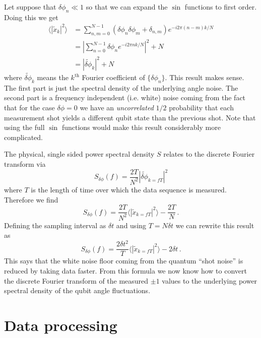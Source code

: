 \documentclass[twocolumn]{article}
\begin{document}
Let suppose that $\delta \phi_n \ll 1$ so that we can expand the $\sin$ functions to first order.
Doing this we get
\begin{align}
\langle |\tilde{x}_k|^2 \rangle
&= \sum_{n,m=0}^{N-1} \left( \delta \phi_n \delta \phi_m + \delta_{n,m} \right) e^{-i 2 \pi (n-m) k / N} \nonumber \\
&= \left| \sum_{n=0}^{N-1} \delta \phi_n e^{-i 2 \pi n k / N} \right|^2 + N \nonumber \\
&= \left| \tilde{\delta \phi}_k \right|^2 + N
\end{align}
where $\tilde{\delta \phi}_k$ means the $k^\text{th}$ Fourier coefficient of $\{ \delta \phi_n \}$.
This result makes sense.
The first part is just the spectral density of the underlying angle noise.
The second part is a frequency independent (i.e. white) noise coming from the fact that for the case $\delta \phi = 0$ we have an \emph{uncorrelated} $1/2$ probability that each measurement shot yields a different qubit state than the previous shot.
Note that using the full $\sin$ functions would make this result considerably more complicated.

The physical, single sided power spectral density $S$ relates to the discrete Fourier transform via
\begin{equation}
S_{\delta \phi}(f) = \frac{2T}{N^2} \left| \tilde{\delta \phi}_{k=fT} \right|^2
\end{equation}
where $T$ is the length of time over which the data sequence is measured.
Therefore we find
\begin{equation}
S_{\delta \phi}(f) = \frac{2T}{N^2} \langle \left| \tilde{x}_{k=fT} \right|^2 \rangle - \frac{2T}{N} \, .
\end{equation}
Defining the sampling interval as $\delta t$ and using $T = N \delta t$ we can rewrite this result as
\begin{equation}
S_{\delta \phi}(f) = \frac{2 \delta t^2}{T} \langle \left| \tilde{x}_{k=fT} \right|^2 \rangle - 2 \delta t \, .
\end{equation}
This says that the white noise floor coming from the quantum ``shot noise'' is reduced by taking data faster.
From this formula we now know how to convert the discrete Fourier transform of the measured $\pm 1$ values to the underlying power spectral density of the qubit angle fluctuations.

% 

\section{Data processing}
\end{document}
